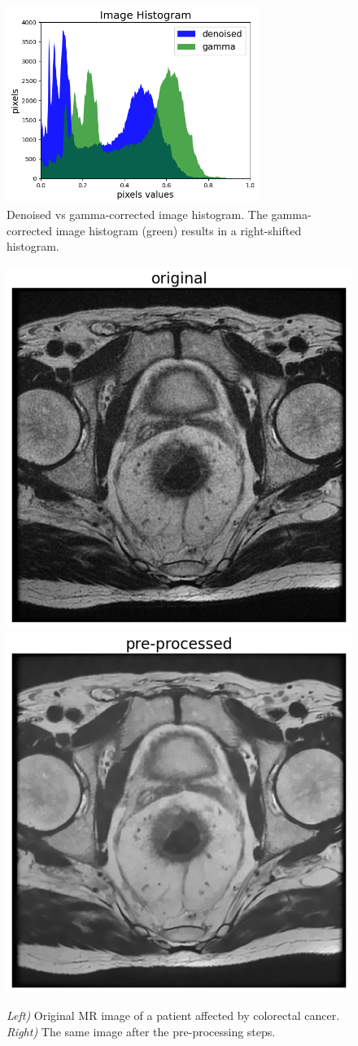 \documentclass{standalone}
\begin{document}
\begin{figure}[htp]

    \centering
    \includegraphics[width=0.73\textwidth]{../images/gammahist.png}

    
    \caption{Denoised vs gamma-corrected image histogram. The gamma-corrected image histogram (green) results in a right-shifted histogram.}
    \label{histogamma}
    
    \end{figure}

\begin{figure}[htp]

    \centering
    \includegraphics[width=.49\textwidth]{../images/noisy.png}
    \includegraphics[width=.49\textwidth]{../images/finalimage.png}
    
    \caption{ \textit{ Left)} Original MR image of a patient affected by colorectal cancer.\textit{ Right)} The same image after the pre-processing steps.}
    \label{noisyfinal}
    
    \end{figure}
\end{document}
